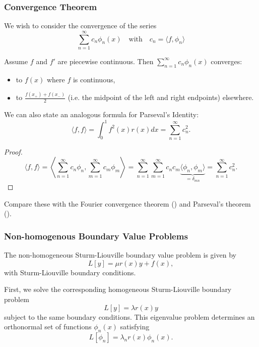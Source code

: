 \subsubsection{Convergence Theorem}

We wish to consider the convergence of the series
\[
\sum_{n=1}^{\infty} c_n \phi_n(x) \quad\text{with}\quad c_n = \langle f, \phi_n\rangle
\]
\begin{theorem}
	Assume $f$ and $f'$ are piecewise continuous. Then $\sum_{n=1}^{\infty} c_n \phi_n(x)$ converges:
	\begin{itemize}
		\item to $f(x)$ where $f$ is continuous,
		\item to $\frac{f(x_+)+f(x_-)}{2}$ (i.e. the midpoint of the left and right endpoints) elsewhere.
	\end{itemize}
\end{theorem}

We can also state an analogous formula for Parseval's Identity:
\begin{equation}
	\langle f,f\rangle = \int_0^1 f^2(x)r(x)dx = \sum_{n=1}^{\infty} c_n^2.
\end{equation}

\begin{proof}
	\[
	\langle f,f\rangle = \left\langle \sum_{n=1}^{\infty} c_n \phi_n, \sum_{m=1}^{\infty} c_m \phi_m\right\rangle = \sum_{n=1}^{\infty} \sum_{m=1}^{\infty} c_n c_m \underbrace{\langle \phi_n, \phi_m\rangle}_{=\delta_{mn}} = \sum_{n=1}^{\infty} c_n^2.
	\]
\end{proof}

Compare these with the Fourier convergence theorem () and Parseval's theorem ().


\subsubsection{Non-homogenous Boundary Value Problems}

The non-homogeneous Sturm-Liouville boundary value problem is given by
\begin{equation}\label{eq6.2.2}
	L[y] = \mu r(x) y + f(x),
\end{equation}
with Sturm-Liouville boundary conditions.

First, we solve the corresponding homogeneous Sturm-Liouville boundary problem
\[
	L[y] = \lambda r(x)y
\]
subject to the same boundary conditions. This eigenvalue problem determines an orthonormal set of functions $\phi_n(x)$ satisfying
\[
	L[\phi_n] = \lambda_n r(x) \phi_n(x).
\]

